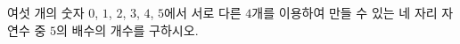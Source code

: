 \hspace*{2mm}\begin{minipage}[t]{\dimexpr\linewidth-2mm\relax}\vspace{0pt}
여섯 개의 숫자 $0$, $1$, $2$, $3$, $4$, $5$에서 서로 다른 $4$개를 이용하여 만들 수 있는 네 자리 자연수 중 $5$의 배수의 개수를 구하시오.\end{minipage}
